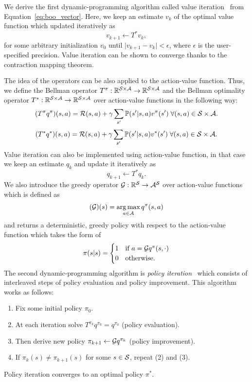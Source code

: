 We  derive the first dynamic-programming algorithm called value iteration~\citep{Bellman1958} from Equation~\ref{eq:boo_vector}. Here, we keep an estimate $v_k$ of the optimal value function which updated iteratively as 
\begin{equation}
  v_{k+1}\gets T^* v_k,
  \label{eq:value_iteration}
\end{equation}
for some arbitrary initialization $v_0$ until $\lvert v_{k+1} - v_k\rvert < \epsilon$, where $\epsilon$ is the user-specified precision. Value iteration can be shown to converge thanks to the contraction mapping theorem. 

The idea of the operators can be also applied to the action-value function. Thus, we define the Bellman operator $T^\pi:\mathbb{R}^{\mathcal{S}\times\mathcal{A}}\rightarrow\mathbb{R}^{\mathcal{S}\times\mathcal{A}}$ and the Bellman optimality operator $T^*:\mathbb{R}^{\mathcal{S}\times\mathcal{A}}\rightarrow\mathbb{R}^{\mathcal{S}\times\mathcal{A}}$ over action-value functions in the following way:
\begin{equation}
(T^\pi q^\pi)(s, a) = \mathcal{R}(s, a) + \gamma \sum_{s'} \mathbb{P}(s'\lvert s, a)v^\pi(s')\;\forall (s, a)\in\mathcal{S}\times\mathcal{A}. 
\end{equation}
\begin{equation}
(T^* q^*)(s, a) = \mathcal{R}(s, a) + \gamma \sum_{s'} \mathbb{P}(s'\lvert s, a)v^*(s')\;\forall (s, a)\in\mathcal{S}\times\mathcal{A}.
\end{equation}
Value iteration can also be implemented using action-value function, in that case we keep an estimate $q_k$ and update it iteratively as
\begin{equation}
  q_{k+1}\gets T^* q_k.
\end{equation}
We also introduce the greedy operator $\mathcal{G}:\mathbb{R}^{\mathcal{S}}\rightarrow\mathcal{A}^{\mathcal{S}}$ over action-value functions which is defined as 
\begin{equation}
  (\mathcal{G})(s) = \operatorname*{arg\,max}_{a\in\mathcal{A}} q^\pi(s, a) 
\end{equation}
and returns a deterministic, greedy policy with respect to the action-value function which takes the form of 
\begin{equation*}
 \pi(s\lvert s) =
    \begin{cases}
      1 & \text{if $a = \mathcal{G} q^\pi(s, \cdot)$}\\
      0 & \text{otherwise}.
    \end{cases}       
\end{equation*}
The second dynamic-programming algorithm is \textit{policy iteration}~\citep{Howard1960} which consists of interleaved steps of policy evaluation and policy improvement. This algorithm works as follows:
 \begin{enumerate}[label=(\arabic*)]
  \item Fix some initial policy $\pi_0$.
  \item At each iteration solve $T^{\pi_k} q^{\pi_k} = q^{\pi_k}$ (policy evaluation).
  \item Then derive new policy $\pi_{k+1}\gets\mathcal{G} q^{\pi_k}$ (policy improvement).
  \item If $\pi_k(s)\neq\pi_{k+1}(s)$ for some $s\in\mathcal{S}$, repeat (2) and (3).
\end{enumerate}
Policy iteration converges to an optimal policy $\pi^*$.

